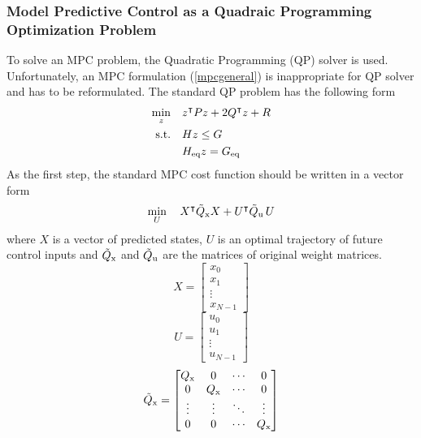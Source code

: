 \subsubsection{Model Predictive Control as a Quadraic Programming Optimization Problem}
To solve an MPC problem, the Quadratic Programming (QP) solver is used. Unfortunately, an MPC formulation (\ref{mpcgeneral}) is inappropriate for QP solver and has to be reformulated. The standard QP problem has the following form
\begin{subequations}
	\begin{align}
	\min_{z}\quad & z^\intercal Pz + 2Q^\intercal z + R\\
	\label{cst_qp}\text{s.t.}\quad&Hz\leq G\\
	&H _{\text{eq}}z = G _{\text{eq}}
	\end{align}
\end{subequations}
As the first step, the standard MPC cost function should be written in a vector form
\begin{equation}
	\min_{U}\quad X^\intercal\tilde{Q} _{\text{x}}X + U^\intercal\tilde{Q} _{\text{u}}\,U\\
\end{equation}
where $X$ is a vector of predicted states, $U$ is an optimal trajectory of future control inputs and $\tilde{Q} _{\text{x}}$ and $\tilde{Q} _{\text{u}}$ are the matrices of original weight matrices.
\begin{equation}
	X = \begin{bmatrix}
	x_0\\x_{1}\\\vdots\\x_{N-1}
		\end{bmatrix}
\end{equation}
\begin{equation}
U = \begin{bmatrix}
u_0\\u_{1}\\\vdots\\u_{N-1}
\end{bmatrix}
\end{equation}
\begin{equation}
\tilde{Q} _{\text{x}} = \begin{bmatrix}
Q _{\text{x}}&0&\cdots&0\\
0&Q _{\text{x}}&\cdots&0\\
\vdots&\vdots&\ddots&\vdots\\
0&0&\cdots&Q _{\text{x}}
\end{bmatrix}
\end{equation}
